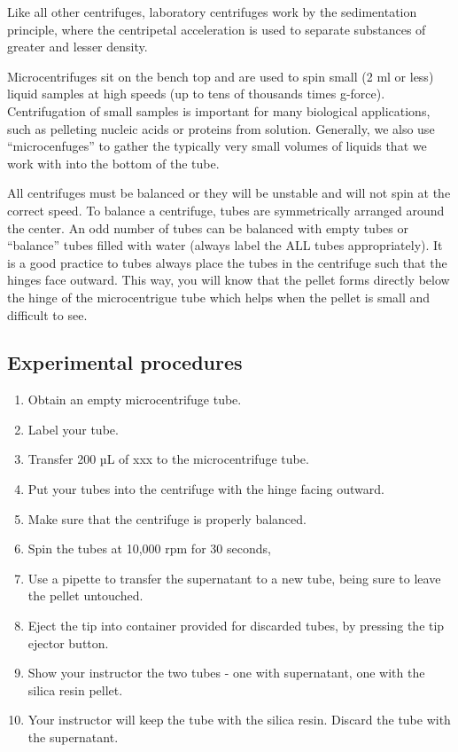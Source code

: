 \documentclass[]{book}
\providecommand{\tightlist}{%
  \setlength{\itemsep}{0pt}\setlength{\parskip}{0pt}}
\theoremstyle{definition}
\theoremstyle{definition}
\theoremstyle{definition}
\theoremstyle{remark}
\begin{document}
Like all other centrifuges, laboratory centrifuges work by the
sedimentation principle, where the centripetal acceleration is used to
separate substances of greater and lesser density.

Microcentrifuges sit on the bench top and are used to spin small (2 ml
or less) liquid samples at high speeds (up to tens of thousands times
g-force). Centrifugation of small samples is important for many
biological applications, such as pelleting nucleic acids or proteins
from solution. Generally, we also use ``microcenfuges'' to gather the
typically very small volumes of liquids that we work with into the
bottom of the tube.

All centrifuges must be balanced or they will be unstable and will not
spin at the correct speed. To balance a centrifuge, tubes are
symmetrically arranged around the center. An odd number of tubes can be
balanced with empty tubes or ``balance'' tubes filled with water (always
label the ALL tubes appropriately). It is a good practice to tubes
always place the tubes in the centrifuge such that the hinges face
outward. This way, you will know that the pellet forms directly below
the hinge of the microcentrigue tube which helps when the pellet is
small and difficult to see.

\subsection{Experimental procedures}\label{experimental-procedures-6}

\begin{enumerate}
\def\labelenumi{\arabic{enumi}.}
\tightlist
\item
  Obtain an empty microcentrifuge tube.
\item
  Label your tube.
\item
  Transfer 200 µL of xxx to the microcentrifuge tube.
\item
  Put your tubes into the centrifuge with the hinge facing outward.
\item
  Make sure that the centrifuge is properly balanced.
\item
  Spin the tubes at 10,000 rpm for 30 seconds,
\item
  Use a pipette to transfer the supernatant to a new tube, being sure to
  leave the pellet untouched.
\item
  Eject the tip into container provided for discarded tubes, by pressing
  the tip ejector button.
\item
  Show your instructor the two tubes - one with supernatant, one with
  the silica resin pellet.
\item
  Your instructor will keep the tube with the silica resin. Discard the
  tube with the supernatant.
\end{enumerate}
\end{document}

